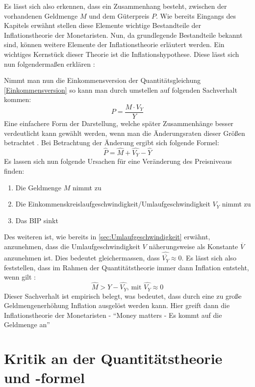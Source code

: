 Es lässt sich also erkennen, dass ein Zusammenhang besteht, zwischen der vorhandenen Geldmenge $M$ und dem Güterpreis $P$. Wie bereits Eingangs des Kapitels erwähnt stellen diese Elemente wichtige Bestandteile der Inflationstheorie der Monetaristen. Nun, da grundlegende Bestandteile bekannt sind, können weitere Elemente der Inflationstheorie erläutert werden. Ein wichtiges Kernstück dieser Theorie ist die Inflationshypothese. Diese lässt sich nun folgendermaßen erklären \autocite{defMon}:

Nimmt man nun die Einkommensversion der Quantitätsgleichung \vref{Einkommensversion} so kann man durch umstellen auf folgenden Sachverhalt kommen:
$$ P = \frac{M \cdot V_Y}{Y} $$
Eine einfachere Form der Darstellung, welche später Zusammenhänge besser verdeutlicht kann gewählt werden, wenn man die Änderungsraten dieser Größen betrachtet \autocite[111]{clement1998grundlagen}. Bei Betrachtung der Änderung ergibt sich folgende Formel:
$$ \widehat{P} = \widehat{M} + \widehat{V_Y} - \widehat{Y} $$
Es lassen sich nun folgende Ursachen für eine Veränderung des Preisniveaus finden:

\begin{enumerate}
    \item Die Geldmenge $M$ nimmt zu
    \item Die Einkommenskreislaufgeschwindigkeit/Umlaufgeschwindigkeit $V_Y$ nimmt zu
    \item Das BIP sinkt
\end{enumerate}

Des weiteren ist, wie bereits in \vref{sec:Umlaufgeschwindigkeit} erwähnt, anzunehmen, dass die Umlaufgeschwindigkeit $V$ näherungsweise als Konstante $\overline{V}$ anzunehmen ist. Dies bedeutet gleichermassen, dass $\widehat{\overline{V_Y}} \approx 0$. Es lässt sich also feststellen, dass im Rahmen der Quantitätstheorie immer dann Inflation entsteht, wenn gilt \autocite[16--17]{historyQunatitaetstheorie}:
    \[
        \widehat{M} > \widehat{Y} - \widehat{V_Y} \text{, mit } \widehat{V_Y} \approx 0
    \]\label{Inflationshyptothese}
Dieser Sachverhalt ist empirisch belegt, was bedeutet, dass durch eine zu große Geldmengenerhöhung Inflation ausgelöst werden kann. Hier greift dann die Inflationstheorie der Monetaristen - \enquote{Money matters - Es kommt auf die Geldmenge an}

\section{Kritik an der Quantitätstheorie und -formel}

